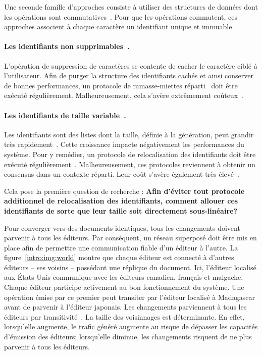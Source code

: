 Une seconde famille d'approches consiste à utiliser des structures de données
dont les opérations sont commutatives~\cite{shapiro2011conflict}. Pour que les
opérations commutent, ces approches associent à chaque caractère un identifiant
unique et immuable.

\paragraph{Les identifiants non supprimables~\cite{oster2006data}.} L'opération
de suppression de caractères se contente de cacher le caractère ciblé à
l'utilisateur. Afin de purger la structure des identifiants cachés et ainsi
conserver de bonnes performances, un protocole de ramasse-miettes
réparti~\cite{abdullahi1998garbage} doit être exécuté
régulièrement. Malheureusement, cela s'avère extrêmement
coûteux~\cite{abdullahi1998garbage}.

\paragraph{Les identifiants de taille variable~\cite{weiss2009logoot}.} Les
identifiants sont des listes dont la taille, définie à la génération, peut
grandir très rapidement~\cite{weiss2009logoot}. Cette croissance impacte
négativement les performances du système. Pour y remédier, un protocole de
relocalisation des identifiants doit être exécuté
régulièrement~\cite{zawirskiasynchronous}. Malheureusement, ces protocoles
reviennent à obtenir un consensus dans un contexte réparti. Leur coût s'avère
également très élevé~\cite{mostefaoui2015signature}.

Cela pose la première question de recherche : \textbf{Afin d'éviter tout
  protocole additionnel de relocalisation des identifiants, comment allouer ces
  identifiants de sorte que leur taille soit directement sous-linéaire?}


Pour converger vers des documents identiques, tous les changements doivent
parvenir à tous les éditeurs. Par conséquent, un réseau superposé doit être mis
en place afin de permettre une communication fiable d'un éditeur à l'autre.  La
figure~\ref{intro:img:world} montre que chaque éditeur est connecté à d'autres
éditeurs -- ses voisins -- possédant une réplique du document. Ici, l'éditeur
localisé aux États-Unis communique avec les éditeurs canadien, français et
malgache. Chaque éditeur participe activement au bon fonctionnement du
système. Une opération émise par ce premier peut transiter par l'éditeur
localisé à Madagascar avant de parvenir à l'éditeur japonais.  Les changements
parviennent à tous les éditeurs par transitivité~\cite{birman1999bimodal}.  La
taille des voisinnages est déterminante. En effet, lorsqu'elle augmente, le
trafic généré augmente au risque de dépasser les capacités d'émission des
éditeurs; lorsqu'elle diminue, les changements risquent de ne plus parvenir à
tous les éditeurs.

